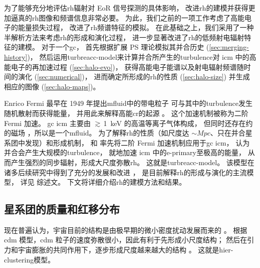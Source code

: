 为了能够充分地评估\ac{rh}辐射对 EoR 信号探测的具体影响，
改进\ac{rh}的建模并获得更加逼真的\ac{rh}图像和频谱信息非常必要。
为此，我们之前的一项工作\cite{wang2010}考虑了高能电子的能量损失过程，
改进了\ac{rh}频谱特征的模拟。
在此基础之上，我们采用了一种半解析方法来考虑\ac{rh}的形成和演化过程，
进一步显著改进了\ac{rh}的低频射电辐射特征的建模。
对于一个\ac{gc}，
首先根据扩展 \ac{PS} 理论模拟其并合历史 (\autoref{sec:merging-history})，
然后运用\ac{turbreacc-model}来计算并合所产生的\ac{turbulence}对
\ac{icm} 中的高能电子的再加速过程 (\autoref{sec:halo-evo})，
获得高能电子能谱以及射电辐射频谱随时间的演化 (\autoref{sec:numerical})，
进而确定所形成的\ac{rh}的性质 (\autoref{sec:halo-size})
并生成相应的图像 (\autoref{sec:halo-maps})。

Enrico Fermi 最早在 1949 年提出\ac{mfluid}中的带电粒子
可与其中的\ac{turbulence}发生随机散射而获得能量，
并用此来解释高能\ac{cr}的起源 \cite{fermi1949,fermi1954,davis1956}。
这个加速机制被称为二阶 Fermi 加速。
\ac{gc} \ac{icm} 主要由 $\gtrsim$\,\SI{1}{\keV} 的高温等离子气体构成，
但同时还存在约 \si{\uG} 的磁场 \cite{govoni2004,ryu2008}，所以是一个\ac{mfluid}。
为了解释\ac{rh}的性质（如尺度达 $\sim\si{Mpc}$、只在并合星系团中发现）和形成机制，
 和 
率先将二阶 Fermi 加速机制应用于\ac{gc} \ac{icm}，
认为并合会产生大规模的\ac{turbulence}，
就地加速 \ac{icm} 中的\ac{e-primary}至极高的能量，
从而产生强烈的同步辐射，形成大尺度弥散\ac{rh}。
这就是\ac{turbreacc-model}。
该模型在诸多后续研究中得到了充分的发展和改进
\cite{fujita2003,brunetti2004,cassano2005,brunetti2007,brunetti2011}，
是目前解释\ac{rh}的形成与演化的主流模型，
详见  综述文。
下文将详细介绍\ac{rh}的建模方法和结果。

\subsection{星系团的质量和红移分布}
\label{sec:mass-function}

现在普遍认为，宇宙目前的结构是由极早期的微小密度扰动发展而来的 \cite{peebles1980}。
根据\acf{cdm} 模型，\ac{cdm} 粒子的速度弥散很小，因此有利于先形成小尺度结构；
然后在引力和宇宙膨胀的共同作用下，逐步形成尺度越来越大的结构
\cite{davis1985,bond1991}。
这就是\acf{hier-clustering}模型。

